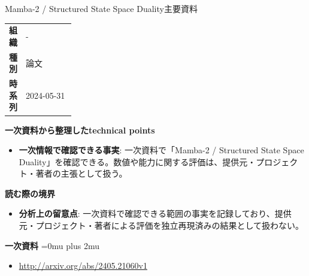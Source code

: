 \begin{technicalnote}{Mamba-2 / Structured State Space Duality}{主要資料}
\begingroup
\begin{tabularx}{\linewidth}{@{}>{\bfseries}p{0.22\linewidth}X@{}}
組織 & - \\
種別 & 論文 \\
時系列 & 2024-05-31 \\
\end{tabularx}
\smallskip
{\bfseries 一次資料から整理したtechnical points}
\begin{itemize}[leftmargin=1.5em,itemsep=0.35em]
\item \textbf{一次情報で確認できる事実}: 一次資料で「Mamba-2 / Structured State Space Duality」を確認できる。数値や能力に関する評価は、提供元・プロジェクト・著者の主張として扱う。
\end{itemize}
\begin{minipage}{\linewidth}
{\bfseries 読む際の境界}
\begin{itemize}[leftmargin=1.5em,itemsep=0.35em]
\item \textbf{分析上の留意点}: 一次資料で確認できる範囲の事実を記録しており、提供元・プロジェクト・著者による評価を独立再現済みの結果として扱わない。
\end{itemize}
\begin{samepage}
{\bfseries 一次資料}
\begingroup\sloppy
\Urlmuskip=0mu plus 2mu\relax
\begin{itemize}[leftmargin=1.5em,itemsep=0.25em]
\item {\scriptsize\url{http://arxiv.org/abs/2405.21060v1}}
\end{itemize}
\endgroup
\end{samepage}
\end{minipage}
\endgroup
\end{technicalnote}
\medskip

